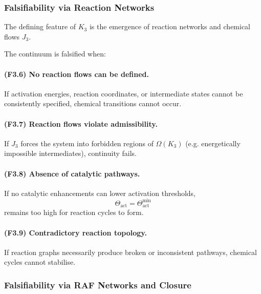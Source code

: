 \subsubsection{Falsifiability via Reaction Networks}

The defining feature of $K_3$ is the emergence of reaction networks and
chemical flows $J_3$.

The continuum is falsified when:

\paragraph{(F3.6) No reaction flows can be defined.}
If activation energies, reaction coordinates, or intermediate states
cannot be consistently specified, chemical transitions cannot occur.

\paragraph{(F3.7) Reaction flows violate admissibility.}
If $J_3$ forces the system into forbidden regions of $\Omega(K_3)$ (e.g.
energetically impossible intermediates), continuity fails.

\paragraph{(F3.8) Absence of catalytic pathways.}
If no catalytic enhancements can lower activation thresholds,
\[
\Theta_{\mathrm{act}} = \Theta_{\mathrm{act}}^{\mathrm{min}}
\]
remains too high for reaction cycles to form.

\paragraph{(F3.9) Contradictory reaction topology.}
If reaction graphs necessarily produce broken or inconsistent pathways,
chemical cycles cannot stabilise.



\subsubsection{Falsifiability via RAF Networks and Closure}

